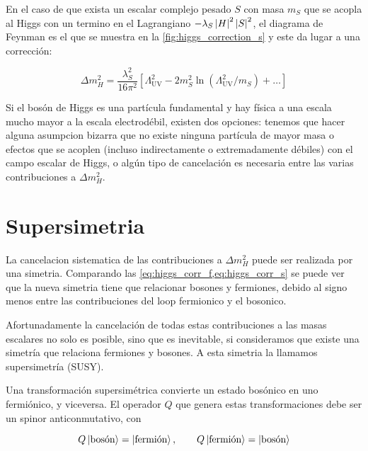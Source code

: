 En el caso de que exista un escalar complejo pesado $S$ con masa $m_S$
que se acopla al Higgs con un termino en el Lagrangiano
$-\lambda_S \left| H \right|^2 \left| S \right|^2$, el diagrama de Feynman es el que se
muestra en la \cref{fig:higgs_correction_s} y este da lugar a una
corrección:

\begin{equation}
  \Delta m_H^2 = \frac{\lambda_S^2}{16\pi^2} \left[ \Lambda^2_\text{UV} - 2 m_S^2 \ln (\Lambda^2_\text{UV}/m_S) +  \ldots \right]
  \label{eq:higgs_corr_s}
\end{equation}

Si el bosón de Higgs es una partícula fundamental y hay física a una
escala mucho mayor a la escala electrodébil, existen dos opciones:
tenemos que hacer alguna asumpcion bizarra que no existe ninguna
partícula de mayor masa o efectos que se acoplen (incluso indirectamente
o extremadamente débiles) con el campo escalar de Higgs, o algún tipo
de  cancelación es necesaria entre las varias contribuciones a $\Delta m_H^2$.

\section{Supersimetria}

La cancelacion sistematica de las contribuciones a $\Delta m_H^2$ puede
ser realizada por una simetria. Comparando las \cref{eq:higgs_corr_f,eq:higgs_corr_s}
se puede ver que la nueva simetria tiene que relacionar bosones y fermiones,
debido al signo menos entre las contribuciones del loop fermionico y el
bosonico.

Afortunadamente la cancelación de todas estas contribuciones a las masas
escalares no solo es posible, sino que es inevitable, si consideramos
que existe una simetría que relaciona fermiones y bosones.
A esta simetria la llamamos supersimetría (SUSY).

Una transformación supersimétrica convierte un estado bosónico en uno
fermiónico, y viceversa. El operador $Q$ que genera estas transformaciones
debe ser un spinor anticonmutativo, con

\begin{equation}
  Q \left| \text{bosón} \right> = \left| \text{fermión} \right>, \quad \quad Q \left| \text{fermión} \right> = \left| \text{bosón} \right>
\end{equation}

